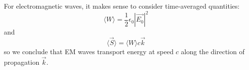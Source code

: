 \documentclass[../Main.tex]{subfiles}
\begin{document}
For electromagnetic waves, it makes sense to consider time-averaged quantities:
\begin{equation*}
    \langle W \rangle = \frac12 \epsilon_0 |\vec{E_0}|^2
\end{equation*}
and
\begin{equation*}
    \langle \vec{S} \rangle = \langle W \rangle c\vec{k}
\end{equation*}
so we conclude that EM waves transport energy at speed $c$ along the direction of propagation $\vec{k}$.
\end{document}
